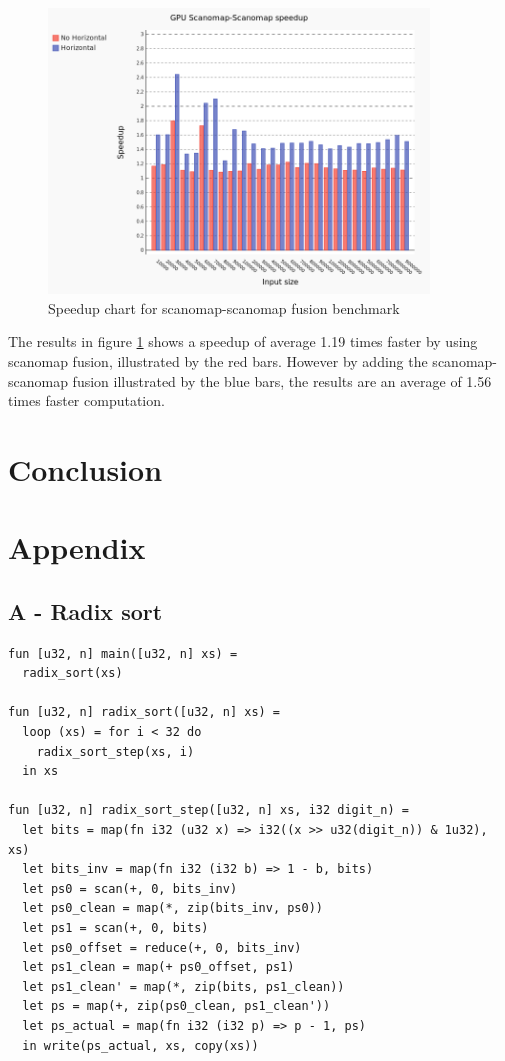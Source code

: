 \documentclass[11pt]{article}
\begin{document}
\begin{figure}[hb]
  \centering
    \includegraphics[width=0.9\textwidth]{images/horri-comparing.png}
  \caption{Speedup chart for scanomap-scanomap fusion benchmark}
  \label{fig:scanomap-scanomap}
\end{figure}

The results in figure \ref{fig:scanomap-scanomap} shows a speedup of average 1.19 times faster by using scanomap fusion, illustrated by the red bars. However by adding the scanomap-scanomap fusion illustrated by the blue bars, the results are an average of 1.56 times faster computation.

\clearpage
\section{Conclusion}
\newpage




\newpage
\section{Appendix}
\subsection{A - Radix sort}
\begin{lstlisting}[caption=Test program] 
fun [u32, n] main([u32, n] xs) =
  radix_sort(xs)

fun [u32, n] radix_sort([u32, n] xs) =
  loop (xs) = for i < 32 do
    radix_sort_step(xs, i)
  in xs

fun [u32, n] radix_sort_step([u32, n] xs, i32 digit_n) =
  let bits = map(fn i32 (u32 x) => i32((x >> u32(digit_n)) & 1u32), xs)
  let bits_inv = map(fn i32 (i32 b) => 1 - b, bits)
  let ps0 = scan(+, 0, bits_inv)
  let ps0_clean = map(*, zip(bits_inv, ps0))
  let ps1 = scan(+, 0, bits)
  let ps0_offset = reduce(+, 0, bits_inv)
  let ps1_clean = map(+ ps0_offset, ps1)
  let ps1_clean' = map(*, zip(bits, ps1_clean))
  let ps = map(+, zip(ps0_clean, ps1_clean'))
  let ps_actual = map(fn i32 (i32 p) => p - 1, ps)
  in write(ps_actual, xs, copy(xs))

\end{lstlisting}
\end{document}
